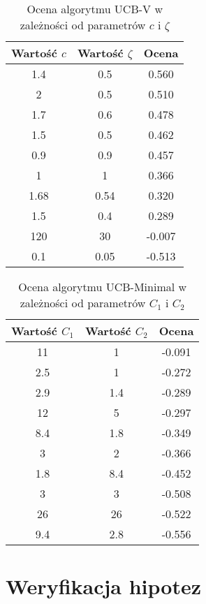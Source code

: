 \documentclass[a4paper,12pt]{article}
\let\oldsection\section
\renewcommand\section{\clearpage\oldsection}
\begin{document}
\begin{table}[!h]
	\centering
	\begin{tabular}{|c|c|c|} \hline
		Wartość $c$ & Wartość $\zeta$ & Ocena \\ \hline
		1.4 & 0.5 & 	0.560 \\ \hline
		2 & 0.5 & 	0.510 \\ \hline
		1.7 & 0.6 & 	0.478 \\ \hline
		1.5 & 0.5 & 	0.462 \\ \hline
		0.9 & 0.9 & 	0.457 \\ \hline
		\rowcolor{teal} 1 & 1 & 	0.366 \\ \hline
		\rowcolor{yellow} 1.68 & 0.54 & 	0.320 \\ \hline
		1.5 & 0.4 & 	0.289 \\ \hline
		120 & 30 & 	-0.007 \\ \hline
		0.1 & 0.05 & 	-0.513 \\ \hline
	\end{tabular}
	\caption{Ocena algorytmu UCB-V w zależności od parametrów $c$ i $\zeta$}
	\label{tab:ucbv_param}
\end{table}

\begin{table}[!h]
	\centering
	\begin{tabular}{|c|c|c|} \hline
		Wartość $C_1$ & Wartość $C_2$ & Ocena \\ \hline
		11 & 1 & 	-0.091 \\ \hline
		\rowcolor{teal} 2.5 & 1 & 	-0.272 \\ \hline
		2.9 & 1.4 & 	-0.289 \\ \hline
		12 & 5 & 	-0.297 \\ \hline
		\rowcolor{yellow} 8.4 & 1.8 & 	-0.349 \\ \hline
		3 & 2 & 	-0.366 \\ \hline
		1.8 & 8.4 & 	-0.452 \\ \hline
		3 & 3 & 	-0.508 \\ \hline
		26 & 26 & 	-0.522 \\ \hline
		9.4 & 2.8 & 	-0.556 \\ \hline
	\end{tabular}
	\caption{Ocena algorytmu UCB-Minimal w zależności od parametrów $C_1$ i $C_2$}
	\label{tab:ucbm_param}
\end{table}

\section{Weryfikacja hipotez}
\end{document}
